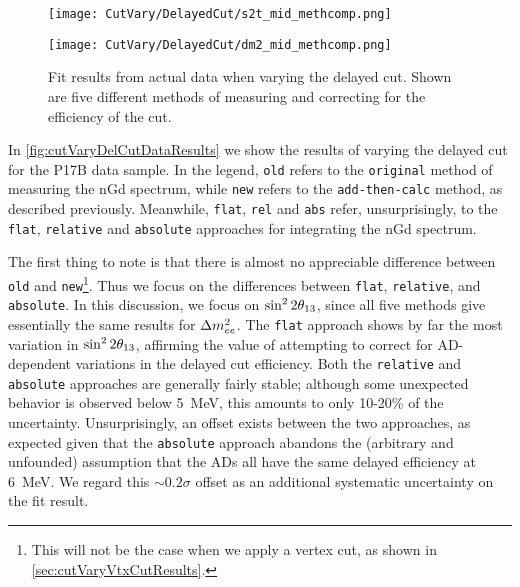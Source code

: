 \documentclass[../thesis.tex]{subfiles}
\begin{document}
\begin{figure}[ht]
  \begin{minipage}{0.5\linewidth}%
    \texttt{[image: CutVary/DelayedCut/s2t\_mid\_methcomp.png]}%
  \end{minipage}%
  \begin{minipage}{0.5\linewidth}%
    \texttt{[image: CutVary/DelayedCut/dm2\_mid\_methcomp.png]}%
  \end{minipage}%
  \caption{Fit results from actual data when varying the delayed cut. Shown are five different methods of measuring and correcting for the efficiency of the cut.}
  \label{fig:cutVaryDelCutDataResults}
\end{figure}

In \autoref{fig:cutVaryDelCutDataResults} we show the results of varying the delayed cut for the P17B data sample. In the legend, \texttt{old} refers to the \texttt{original} method of measuring the nGd spectrum, while \texttt{new} refers to the \texttt{add-then-calc} method, as described previously. Meanwhile, \texttt{flat}, \texttt{rel} and \texttt{abs} refer, unsurprisingly, to the \texttt{flat}, \texttt{relative} and \texttt{absolute} approaches for integrating the nGd spectrum.

The first thing to note is that there is almost no appreciable difference between \texttt{old} and \texttt{new}\footnote{This will not be the case when we apply a vertex cut, as shown in \autoref{sec:cutVaryVtxCutResults}.}. Thus we focus on the differences between \texttt{flat}, \texttt{relative}, and \texttt{absolute}. In this discussion, we focus on $\sin^2 2\theta_{13}$, since all five methods give essentially the same results for $\Delta m^2_{ee}$. The \texttt{flat} approach shows by far the most variation in $\sin^2 2\theta_{13}$, affirming the value of attempting to correct for AD-dependent variations in the delayed cut efficiency. Both the \texttt{relative} and \texttt{absolute} approaches are generally fairly stable; although some unexpected behavior is observed below 5~MeV, this amounts to only 10-20\% of the uncertainty. Unsurprisingly, an offset exists between the two approaches, as expected given that the \texttt{absolute} approach abandons the (arbitrary and unfounded) assumption that the ADs all have the same delayed efficiency at 6~MeV. We regard this $\sim0.2\sigma$ offset as an additional systematic uncertainty on the fit result.%
\end{document}

